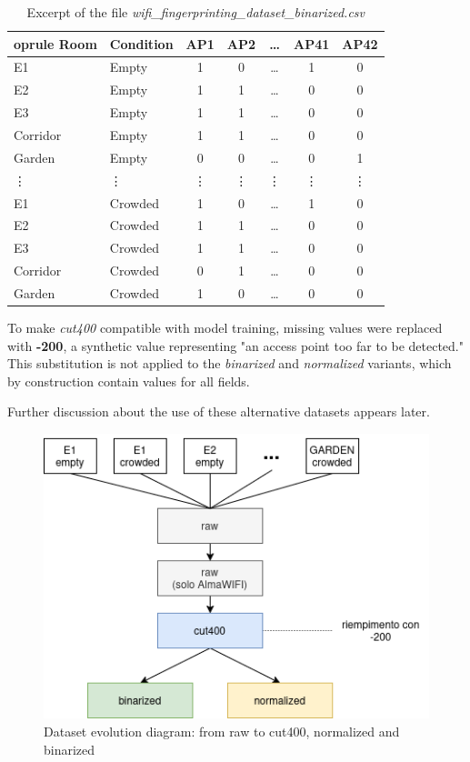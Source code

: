\documentclass{article}
\begin{document}
\begin{table}[ht!]
    \centering
    \small
    \begin{tabular}{llc c c cc}
        	oprule
        Room & Condition & AP1 & AP2 & \dots & AP41 & AP42 \\
        \midrule
        E1 & Empty & 1 & 0 & \dots & 1 & 0 \\
        E2 & Empty & 1 & 1  & \dots & 0 & 0\\
        E3 & Empty & 1 & 1 & \dots & 0 & 0 \\
        Corridor & Empty & 1 & 1  & \dots & 0 &0 \\
        Garden & Empty & 0 & 0  & \dots &  0& 1\\
         \vdots & \vdots & \vdots & \vdots & \vdots & \vdots & \vdots \\
        E1 & Crowded & 1 & 0 & \dots & 1 & 0 \\
        E2 & Crowded & 1 & 1  & \dots & 0 & 0\\   
        E3 & Crowded & 1 & 1 & \dots & 0 & 0 \\
        Corridor & Crowded & 0 & 1  & \dots & 0 & 0\\
        Garden & Crowded & 1 & 0  & \dots & 0 & 0\\
        \bottomrule
    \end{tabular}
    \caption{Excerpt of the file \textit{wifi\_fingerprinting\_dataset\_binarized.csv}}
    \label{tab:wifi_data_bin}
\end{table}

To make \textit{cut400} compatible with model training, missing values were replaced with \textbf{-200}, a synthetic value representing "an access point too far to be detected." This substitution is not applied to the \textit{binarized} and \textit{normalized} variants, which by construction contain values for all fields.

Further discussion about the use of these alternative datasets appears later.

\begin{figure}[ht!]
    \centering
    \includegraphics[width=0.5\linewidth]{img/datasetHistory.png}
    \caption{Dataset evolution diagram: from raw to cut400, normalized and binarized}
    \label{fig:datasetHistory}
\end{figure}
\end{document}
